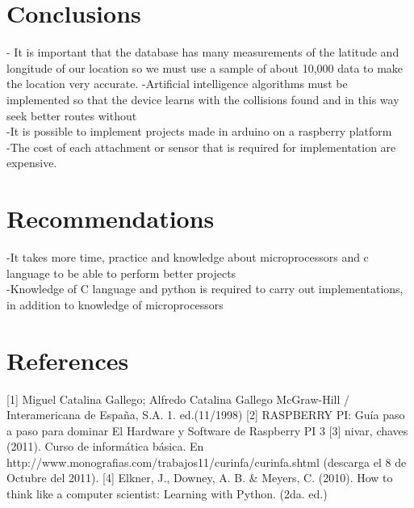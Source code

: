 \documentclass[11pt,a4paper,twocolumn]{article}
\begin{document}
\section{Conclusions}
- It is important that the database has many measurements of the latitude and longitude of our location so we must use a sample of about 10,000 data to make the location very accurate.
-Artificial intelligence algorithms must be implemented so that the device learns with the collisions found and in this way seek better routes without \\
-It is possible to implement projects made in arduino on a raspberry platform\\
-The cost of each attachment or sensor that is required for implementation are expensive.

\section{Recommendations}
-It takes more time, practice and knowledge about microprocessors and c language to be able to perform better projects\\
-Knowledge of C language and python is required to carry out implementations, in addition to knowledge of microprocessors
\section{References}
[1] Miguel Catalina Gallego; Alfredo Catalina Gallego
McGraw-Hill / Interamericana de España, S.A.
1. ed.(11/1998)
[2] RASPBERRY PI: Guía paso a paso para dominar 
El Hardware y Software de Raspberry PI 3
[3] nivar, chaves (2011). Curso de informática básica. En http://www.monografias.com/trabajos11/curinfa/curinfa.shtml 
(descarga el 8 de Octubre del 2011).
[4] Elkner, J., Downey, A. B. & Meyers, C. (2010). 
How to think like a computer scientist: Learning with Python. (2da. ed.) 
\end{document}
